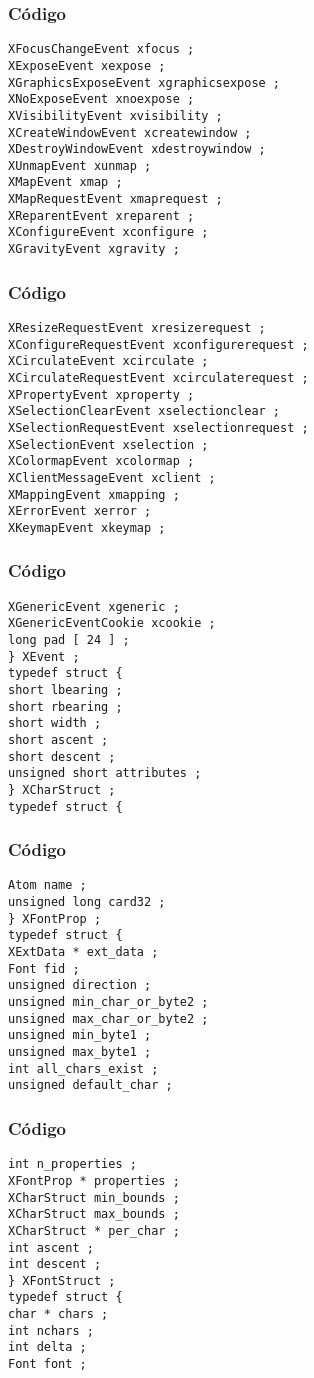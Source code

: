 \documentclass{beamer}
\begin{document}
\begin{frame}[fragile]
\frametitle{C\'odigo}
\begin{verbatim}
XFocusChangeEvent xfocus ; 
XExposeEvent xexpose ; 
XGraphicsExposeEvent xgraphicsexpose ; 
XNoExposeEvent xnoexpose ; 
XVisibilityEvent xvisibility ; 
XCreateWindowEvent xcreatewindow ; 
XDestroyWindowEvent xdestroywindow ; 
XUnmapEvent xunmap ; 
XMapEvent xmap ; 
XMapRequestEvent xmaprequest ; 
XReparentEvent xreparent ; 
XConfigureEvent xconfigure ; 
XGravityEvent xgravity ; 
\end{verbatim}
\end{frame}
\begin{frame}[fragile]
\frametitle{C\'odigo}
\begin{verbatim}
XResizeRequestEvent xresizerequest ; 
XConfigureRequestEvent xconfigurerequest ; 
XCirculateEvent xcirculate ; 
XCirculateRequestEvent xcirculaterequest ; 
XPropertyEvent xproperty ; 
XSelectionClearEvent xselectionclear ; 
XSelectionRequestEvent xselectionrequest ; 
XSelectionEvent xselection ; 
XColormapEvent xcolormap ; 
XClientMessageEvent xclient ; 
XMappingEvent xmapping ; 
XErrorEvent xerror ; 
XKeymapEvent xkeymap ; 
\end{verbatim}
\end{frame}
\begin{frame}[fragile]
\frametitle{C\'odigo}
\begin{verbatim}
XGenericEvent xgeneric ; 
XGenericEventCookie xcookie ; 
long pad [ 24 ] ; 
} XEvent ; 
typedef struct { 
short lbearing ; 
short rbearing ; 
short width ; 
short ascent ; 
short descent ; 
unsigned short attributes ; 
} XCharStruct ; 
typedef struct { 
\end{verbatim}
\end{frame}
\begin{frame}[fragile]
\frametitle{C\'odigo}
\begin{verbatim}
Atom name ; 
unsigned long card32 ; 
} XFontProp ; 
typedef struct { 
XExtData * ext_data ; 
Font fid ; 
unsigned direction ; 
unsigned min_char_or_byte2 ; 
unsigned max_char_or_byte2 ; 
unsigned min_byte1 ; 
unsigned max_byte1 ; 
int all_chars_exist ; 
unsigned default_char ; 
\end{verbatim}
\end{frame}
\begin{frame}[fragile]
\frametitle{C\'odigo}
\begin{verbatim}
int n_properties ; 
XFontProp * properties ; 
XCharStruct min_bounds ; 
XCharStruct max_bounds ; 
XCharStruct * per_char ; 
int ascent ; 
int descent ; 
} XFontStruct ; 
typedef struct { 
char * chars ; 
int nchars ; 
int delta ; 
Font font ; 
\end{verbatim}
\end{frame}
\end{document}
